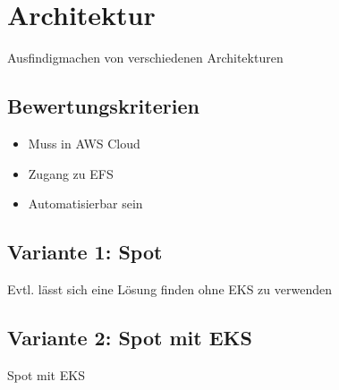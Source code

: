 \section{Architektur}
Ausfindigmachen von verschiedenen Architekturen
\subsection{Bewertungskriterien}
\begin{itemize}
\item Muss in AWS Cloud
\item Zugang zu EFS
\item Automatisierbar sein
\end{itemize}
\subsection{Variante 1: Spot}
Evtl. lässt sich eine Lösung finden ohne EKS zu verwenden

\subsection{Variante 2: Spot mit EKS}
Spot mit EKS